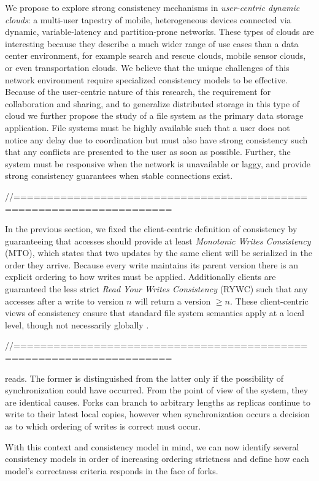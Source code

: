 We propose to explore strong consistency mechanisms in \textit{user-centric dynamic clouds}: a
multi-user tapestry of mobile, heterogeneous devices connected via dynamic, variable-latency and
partition-prone networks.
These types of clouds are interesting because they describe a much wider range of use
cases than a data center environment, for example search and rescue clouds, mobile sensor
clouds, or even transportation clouds.
We believe that the unique challenges of this network environment require specialized
consistency models to be effective.
Because of the user-centric nature of this research, the requirement for collaboration and
sharing, and to generalize distributed storage in this type of cloud we further propose
the study of a file system as the primary data storage application.
File systems must be highly available such that a user does not notice any delay due to
coordination but must also have strong consistency such that any conflicts are presented
to the user as soon as possible.
Further, the system must be responsive when the network is unavailable or laggy, and provide strong
consistency guarantees when stable connections exist.

//=====================================================================

In the previous section, we fixed the client-centric definition of consistency by
guaranteeing that accesses should provide at least \textit{Monotonic Writes Consistency}
(MTO), which states that two updates by the same client will be serialized in the order
they arrive. Because every write maintains its parent version there is an explicit
ordering to how writes must be applied. Additionally clients are guaranteed the less
strict \textit{Read Your Writes Consistency} (RYWC) such that any accesses after a write
to version $n$ will return a version $\geq n$. These client-centric views of consistency
ensure that standard file system semantics apply at a local level, though not necessarily
globally \cite{bermbach_consistency_2013}.

//=====================================================================

reads.
The former is distinguished from the latter only if the possibility of synchronization
could have occurred.
From the point of view of the system, they are identical causes.
Forks can branch to arbitrary lengths as replicas continue to write to their latest local
copies, however when synchronization occurs a decision as to which ordering of writes is
correct must occur.

With this context and consistency model in mind, we can now identify several consistency models in order of increasing ordering strictness and define how each model's correctness criteria responds in the face of forks.
